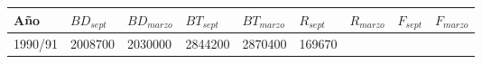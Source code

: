 \documentclass[
  spanish,
]{article}
\begin{document}
\begin{longtable}[]{@{}lllllllll@{}}
\toprule
\begin{minipage}[b]{0.06\columnwidth}\raggedright
Año\strut
\end{minipage} & \begin{minipage}[b]{0.09\columnwidth}\raggedright
\(BD_{sept}\)\strut
\end{minipage} & \begin{minipage}[b]{0.10\columnwidth}\raggedright
\(BD_{marzo}\)\strut
\end{minipage} & \begin{minipage}[b]{0.09\columnwidth}\raggedright
\(BT_{sept}\)\strut
\end{minipage} & \begin{minipage}[b]{0.10\columnwidth}\raggedright
\(BT_{marzo}\)\strut
\end{minipage} & \begin{minipage}[b]{0.08\columnwidth}\raggedright
\(R_{sept}\)\strut
\end{minipage} & \begin{minipage}[b]{0.09\columnwidth}\raggedright
\(R_{marzo}\)\strut
\end{minipage} & \begin{minipage}[b]{0.08\columnwidth}\raggedright
\(F_{sept}\)\strut
\end{minipage} & \begin{minipage}[b]{0.09\columnwidth}\raggedright
\(F_{marzo}\)\strut
\end{minipage}\tabularnewline
\midrule
\endhead
\begin{minipage}[t]{0.06\columnwidth}\raggedright
1990/91\strut
\end{minipage} & \begin{minipage}[t]{0.09\columnwidth}\raggedright
2008700\strut
\end{minipage} & \begin{minipage}[t]{0.10\columnwidth}\raggedright
2030000\strut
\end{minipage} & \begin{minipage}[t]{0.09\columnwidth}\raggedright
2844200\strut
\end{minipage} & \begin{minipage}[t]{0.10\columnwidth}\raggedright
2870400\strut
\end{minipage} & \begin{minipage}[t]{0.08\columnwidth}\raggedright
169670\strut
\end{minipage} & \begin{minipage}[t]{0.09\columnwidth}\raggedright

\end{minipage}
\end{longtable}
\end{document}
